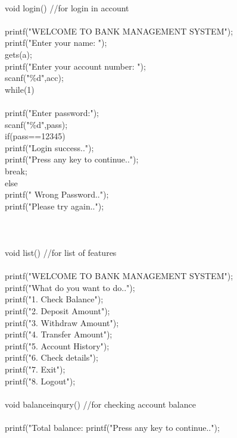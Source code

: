 \documentclass[12pt,a4 paper]{article}
\begin{document}
\\
void login()         //for login in account\\
{\\
	  printf("WELCOME TO BANK MANAGEMENT SYSTEM");\\
    printf("Enter your name: ");\\
    gets(a);\\
    printf("Enter your account number: ");\\
    scanf("\%d",acc);\\
    while(1)\\
    {\\
    printf("Enter password:");\\
    scanf("\%d",pass);\\
    if(pass==12345){\\
    printf("Login success..");\\
    printf("Press any key to continue..");\\
    break;}\\
   else  {\\
    printf(" Wrong Password..");\\
    printf("Please try again..");}\\
    }\\
}   \\
\\
void list()              //for list of features\\
{\\
  printf("WELCOME TO BANK MANAGEMENT SYSTEM");\\
  printf("What do you want to do..");\\
  printf("1. Check Balance");\\
  printf("2. Deposit Amount");\\
  printf("3. Withdraw Amount");\\
  printf("4. Transfer Amount");\\
  printf("5. Account History");\\
  printf("6. Check details");\\
  printf("7. Exit");\\
  printf("8. Logout");\\
}\\
void balanceinqury()        //for checking account balance\\
{\\
	printf("Total balance: %
	printf("Press any key to continue..");\\
}\\
\end{document}
